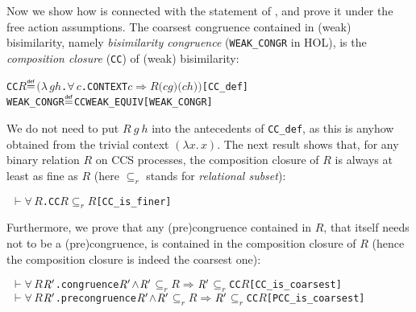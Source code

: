 \documentclass[GCNS]{yincog}
\renewcommand{\HOLConst}[1]{\texttt{#1}}
\renewcommand{\HOLBoundVar}[1]{\ensuremath{\mathit{#1}}}
\renewcommand{\HOLFreeVar}[1]{\ensuremath{\mathit{#1}}}
\renewcommand{\HOLSymConst}[1]{#1}
\renewcommand{\HOLTokenConj}{\ensuremath{\wedge}}
\renewcommand{\HOLTokenRSubset}{\ensuremath{\subseteq _r}}
\renewcommand{\HOLTokenDefEquality}{\ensuremath{\mathrel{\overset{\makebox [0pt]{\text{\tiny \textsf{def}}}}{=}}}}
\renewcommand{\HOLTokenForall}{\ensuremath{\forall \,}}
\renewcommand{\HOLTokenLambda}{\ensuremath{\lambda \,}}
\renewcommand{\HOLTokenTurnstile}{\ensuremath{\:\:\vdash}}
\theoremstyle{remark}
\theoremstyle{theorem}
\theoremstyle{remark}
\renewcommand{\HOLTokenImp}{\ensuremath{\Longrightarrow}}
\begin{document}
Now we show how  is connected with the statement of
, and prove it under the free action assumptions.
The coarsest congruence contained in (weak) bisimilarity, namely
\emph{bisimilarity congruence} (\texttt{WEAK\_CONGR} in HOL), is the
\emph{composition closure} (\texttt{CC}) of (weak) bisimilarity:
%
\begin{alltt}
   \HOLConst{CC} \HOLFreeVar{R} \HOLTokenDefEquality{} \ensuremath{(}\HOLTokenLambda{}\HOLBoundVar{g} \HOLBoundVar{h}. \HOLSymConst{\HOLTokenForall{}}\HOLBoundVar{c}. \HOLConst{CONTEXT} \HOLBoundVar{c} \HOLSymConst{\HOLTokenImp{}} \HOLFreeVar{R} \ensuremath{(}\HOLBoundVar{c} \HOLBoundVar{g}\ensuremath{)} \ensuremath{(}\HOLBoundVar{c} \HOLBoundVar{h}\ensuremath{)}\ensuremath{)}\hfill{[CC\_def]}
   \HOLConst{WEAK\_CONGR} \HOLTokenDefEquality{} \HOLConst{CC} \HOLConst{WEAK\_EQUIV}\hfill{[WEAK\_CONGR]}
\end{alltt}
%
We do not need to put $R\ g\ h$ into the antecedents of
\texttt{CC\_def}, as this is anyhow obtained from the trivial context
$(\lambda x.\,x)$. The next result shows that, for any binary relation
$R$ on CCS processes, the composition closure of $R$ is always at least
as fine as $R$ (here $\subseteq _r$ stands for
\emph{relational subset}):
%
\begin{alltt}
\HOLTokenTurnstile{} \HOLSymConst{\HOLTokenForall{}}\HOLBoundVar{R}. \HOLConst{CC} \HOLBoundVar{R} \HOLSymConst{\HOLTokenRSubset{}} \HOLBoundVar{R}\hfill{[CC\_is\_finer]}
\end{alltt}
%
Furthermore, we prove that any (pre)congruence contained in $R$, that itself
needs not to be a (pre)congruence, is contained in the composition closure
of $R$ (hence the composition closure is indeed the coarsest one):
%
\begin{alltt}
\HOLTokenTurnstile{} \HOLSymConst{\HOLTokenForall{}}\HOLBoundVar{R} \ensuremath{\HOLBoundVar{R}\sp{\prime}}. \HOLConst{congruence} \ensuremath{\HOLBoundVar{R}\sp{\prime}} \HOLSymConst{\HOLTokenConj{}} \ensuremath{\HOLBoundVar{R}\sp{\prime}} \HOLSymConst{\HOLTokenRSubset{}} \HOLBoundVar{R} \HOLSymConst{\HOLTokenImp{}} \ensuremath{\HOLBoundVar{R}\sp{\prime}} \HOLSymConst{\HOLTokenRSubset{}} \HOLConst{CC} \HOLBoundVar{R}\hfill{[CC\_is\_coarsest]}
\HOLTokenTurnstile{} \HOLSymConst{\HOLTokenForall{}}\HOLBoundVar{R} \ensuremath{\HOLBoundVar{R}\sp{\prime}}. \HOLConst{precongruence} \ensuremath{\HOLBoundVar{R}\sp{\prime}} \HOLSymConst{\HOLTokenConj{}} \ensuremath{\HOLBoundVar{R}\sp{\prime}} \HOLSymConst{\HOLTokenRSubset{}} \HOLBoundVar{R} \HOLSymConst{\HOLTokenImp{}} \ensuremath{\HOLBoundVar{R}\sp{\prime}} \HOLSymConst{\HOLTokenRSubset{}} \HOLConst{CC} \HOLBoundVar{R}\hfill{[PCC\_is\_coarsest]}
\end{alltt}
\end{document}
